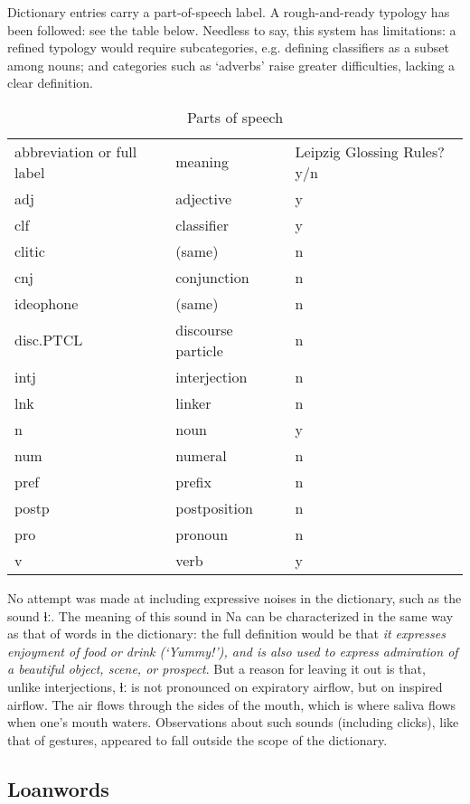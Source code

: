 \documentclass[oldfontcommands,oneside,a4paper,11pt]{article}
\newcommand{\ipa}[1]{{\phon #1}} %
\begin{document}
	Dictionary entries carry a part-of-speech label. A rough-and-ready typology has been followed: see the table below. Needless to say, this system has limitations: a refined typology would require subcategories, e.g. defining classifiers as a subset among nouns; and categories such as ‘adverbs' raise greater difficulties, lacking a clear definition.
	\begin{table}
		\caption{Parts of speech}
		\begin{tabular}{lll}
			abbreviation or full label & meaning & Leipzig Glossing Rules? y/n \\
			adj & adjective & y \\
			clf & classifier & y \\
			clitic & (same) & n \\
			cnj & conjunction & n \\
			ideophone & (same) & n \\
			disc.PTCL & discourse particle & n \\
			intj & interjection & n \\
			lnk & linker & n \\
			n & noun & y \\
			num & numeral & n \\
			pref & prefix & n \\
			postp & postposition & n \\
			pro & pronoun & n \\
			v & verb & y \\
		\end{tabular}
	\end{table}
	
	No attempt was made at including expressive noises in the dictionary, such as the sound \ipa{ɬː}. The meaning of this sound in Na can be characterized in the same way as that of words in the dictionary: the full definition would be that  \textit{it expresses enjoyment of food or drink (‘Yummy!'), and is also used to express admiration of a beautiful object, scene, or prospect}. But a reason for leaving it out is that, unlike interjections,  \ipa{ɬː} is not pronounced on expiratory airflow, but on inspired airflow. The air flows through the sides of the mouth, which is where saliva flows when one's mouth waters. Observations about such sounds (including clicks), like that of gestures, appeared to fall outside the scope of the dictionary.
	
	\subsection{Loanwords} \label{sec:loan}
	
\end{document}
